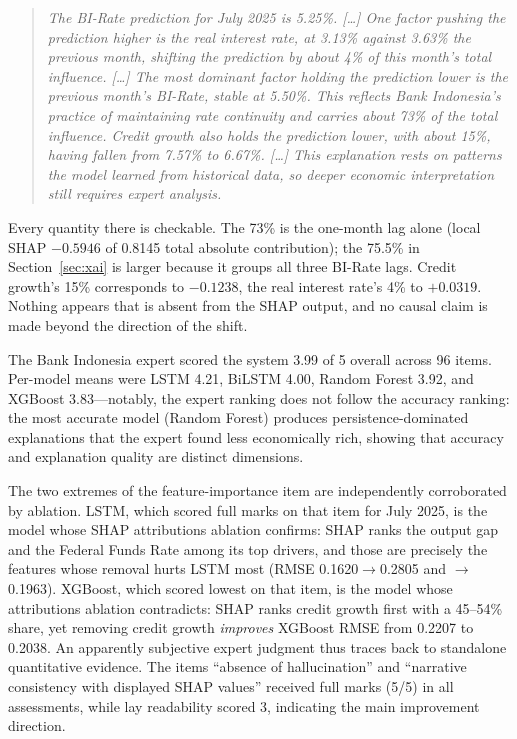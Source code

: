 \documentclass[conference]{IEEEtran}
\begin{document}
\begin{quote}\small\itshape
The BI-Rate prediction for July 2025 is 5.25\%. [\ldots] One factor pushing the prediction higher is the real interest rate, at 3.13\% against 3.63\% the previous month, shifting the prediction by about 4\% of this month's total influence. [\ldots] The most dominant factor holding the prediction lower is the previous month's BI-Rate, stable at 5.50\%. This reflects Bank Indonesia's practice of maintaining rate continuity and carries about 73\% of the total influence. Credit growth also holds the prediction lower, with about 15\%, having fallen from 7.57\% to 6.67\%. [\ldots] This explanation rests on patterns the model learned from historical data, so deeper economic interpretation still requires expert analysis.
\end{quote}

Every quantity there is checkable. The 73\% is the one-month lag alone (local SHAP $-0.5946$ of 0.8145 total absolute contribution); the 75.5\% in Section~\ref{sec:xai} is larger because it groups all three BI-Rate lags. Credit growth's 15\% corresponds to $-0.1238$, the real interest rate's 4\% to $+0.0319$. Nothing appears that is absent from the SHAP output, and no causal claim is made beyond the direction of the shift.

The Bank Indonesia expert scored the system 3.99 of 5 overall across 96 items. Per-model means were LSTM 4.21, BiLSTM 4.00, Random Forest 3.92, and XGBoost 3.83---notably, the expert ranking does not follow the accuracy ranking: the most accurate model (Random Forest) produces persistence-dominated explanations that the expert found less economically rich, showing that accuracy and explanation quality are distinct dimensions.

The two extremes of the feature-importance item are independently corroborated by ablation. LSTM, which scored full marks on that item for July 2025, is the model whose SHAP attributions ablation confirms: SHAP ranks the output gap and the Federal Funds Rate among its top drivers, and those are precisely the features whose removal hurts LSTM most (RMSE 0.1620$\rightarrow$0.2805 and $\rightarrow$0.1963). XGBoost, which scored lowest on that item, is the model whose attributions ablation contradicts: SHAP ranks credit growth first with a 45--54\% share, yet removing credit growth \emph{improves} XGBoost RMSE from 0.2207 to 0.2038. An apparently subjective expert judgment thus traces back to standalone quantitative evidence. The items ``absence of hallucination'' and ``narrative consistency with displayed SHAP values'' received full marks (5/5) in all assessments, while lay readability scored 3, indicating the main improvement direction.
\end{document}
